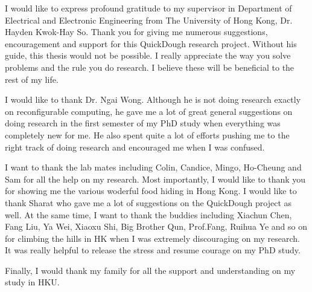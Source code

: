 I would like to express profound gratitude to my supervisor in Department of Electrical and Electronic Engineering from The University of Hong Kong, Dr. Hayden Kwok-Hay So. Thank you for giving me numerous suggestions, encouragement and support for this QuickDough research project. Without his guide, this thesis would not be possible. I really appreciate the way you solve problems and the rule you do research. I believe these will be beneficial to the rest of my life.

I would like to thank Dr. Ngai Wong. Although he is not doing research exactly on reconfigurable computing, he gave me a lot of great general suggestions on doing research in the first semester of my PhD study when everything was completely new for me. He also spent quite a lot of efforts pushing me to the right track of doing research and encouraged me when I was confused. 


I want to thank the lab mates including Colin, Candice, Mingo, Ho-Cheung and Sam for all the help on my research. Most importantly, I would like to thank you for showing me the various woderful food hiding in Hong Kong. I would like to thank Sharat who gave me a lot of suggestions on the QuickDough project as well. At the same time, I want to thank the buddies including Xiachun Chen, Fang Liu, Ya Wei, Xiaoxu Shi, Big Brother Qun, Prof.Fang, Ruihua Ye and so on for climbing the hills in HK when I was extremely discouraging on my research. It was really helpful to release the stress and resume courage on my PhD study.

Finally, I would thank my family for all the support and understanding on my study in HKU. 

